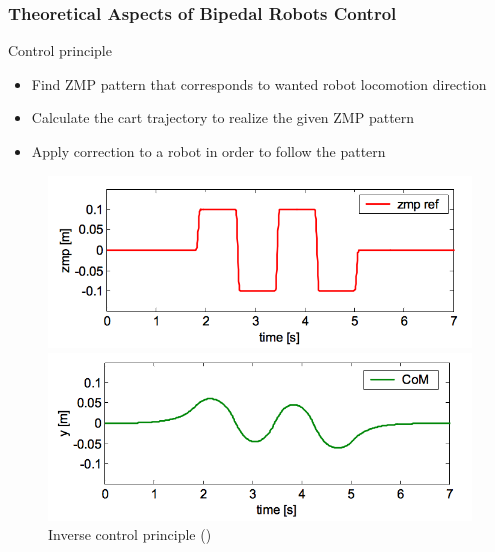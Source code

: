 \documentclass{beamer}
\begin{document}
\begin{frame}
	\frametitle{Theoretical Aspects of Bipedal Robots Control}
	\begin{block}{Control principle}
		\begin{itemize}
			\item
			Find ZMP pattern that corresponds to wanted robot locomotion direction
			\item
			Calculate the cart trajectory to realize the given ZMP pattern
			\item
			Apply correction to a robot in order to follow the pattern
		\end{itemize}
	\end{block}
	
	\begin{figure}[h!]
		\begin{minipage}[H]{0.45\linewidth}
			\centering
			\includegraphics[width=\linewidth]{presentation_images/13}
		\end{minipage}
		\hfill
		\begin{minipage}[H]{0.45\linewidth}
			\centering
			\includegraphics[width=\linewidth]{presentation_images/14}
		\end{minipage}
		
		\caption{Inverse control principle (\cite{kajita2003biped})}
	\end{figure}
\end{frame}

\end{document}

